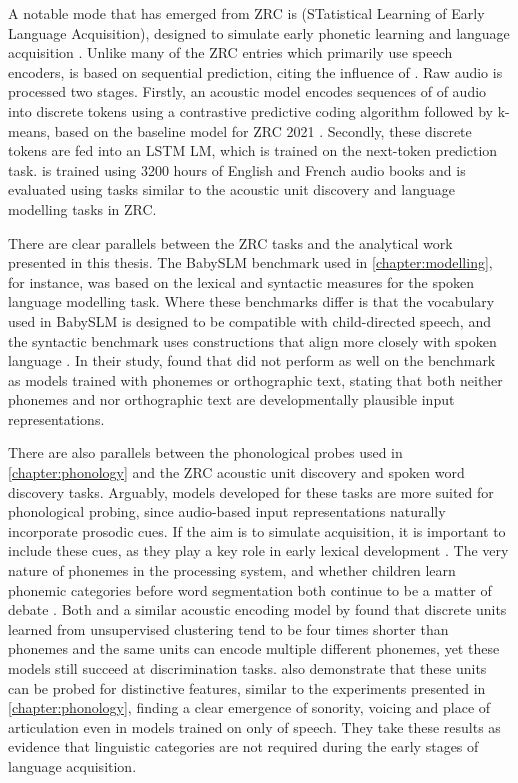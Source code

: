 A notable mode that has emerged from ZRC is \stela (STatistical Learning of Early Language Acquisition), designed to simulate early phonetic learning and language acquisition \citep{lavechin2022can, lavechin2025simulating}. Unlike many of the ZRC entries which primarily use speech encoders, \stela is based on sequential prediction, citing the influence of \citet{elman-1990-finding}. Raw audio is processed two stages. Firstly, an acoustic model encodes sequences of  of audio into discrete tokens using a contrastive predictive coding algorithm followed by k-means, based on the baseline model for ZRC 2021 \citep{nguyen2020zero}. Secondly, these discrete tokens are fed into an LSTM LM, which is trained on the next-token prediction task. \stela is trained using 3200 hours of English and French audio books and is evaluated using tasks similar to the acoustic unit discovery and language modelling tasks in ZRC.

There are clear parallels between the ZRC tasks and the analytical work presented in this thesis. The BabySLM benchmark used in \cref{chapter:modelling}, for instance, was based on the lexical and syntactic measures for the spoken language modelling task. Where these benchmarks differ is that the vocabulary used in BabySLM is designed to be compatible with child-directed speech, and the syntactic benchmark uses constructions that align more closely with spoken language \citep{lavechin}. In their study, \citet{lavechin} found that \stela did not perform as well on the benchmark as models trained with phonemes or orthographic text, stating that both neither phonemes and nor orthographic text are developmentally plausible input representations.

There are also parallels between the phonological probes used in \cref{chapter:phonology} and the ZRC acoustic unit discovery and spoken word discovery tasks. Arguably, models developed for these tasks are more suited for phonological probing, since audio-based input representations naturally incorporate prosodic cues. If the aim is to simulate acquisition, it is important to include these cues, as they play a key role in early lexical development \citep{Cutler1987, Jusczyk1993stress, jusczyk-1999-stress-voice}. The very nature of phonemes in the processing system, and whether children learn phonemic categories before word segmentation both continue to be a matter of debate \citep{kazanina2018phonemes, matusevych2023infant}. Both \stela and a similar acoustic encoding model by \citet{schatz2021early} found that discrete units learned from unsupervised clustering tend to be four times shorter than phonemes and the same units can encode multiple different phonemes, yet these models still succeed at discrimination tasks. \citet{lavechin2025simulating} also demonstrate that these units can be probed for distinctive features, similar to the experiments presented in \cref{chapter:phonology}, finding a clear emergence of sonority, voicing and place of articulation even in models trained on only  of speech. They take these results as evidence that linguistic categories are not required during the early stages of language acquisition.

